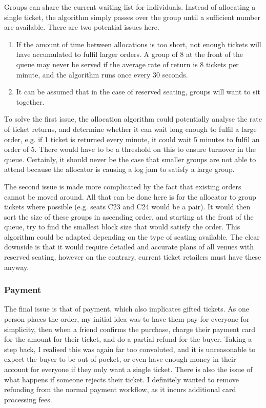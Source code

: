 \documentclass[12pt,a4paper]{bhamdissertation}
\begin{document}
Groups can share the current waiting list for individuals. Instead of allocating a single ticket, the algorithm simply passes over the group until a sufficient number are available. There are two potential issues here.

\begin{enumerate}
    \item If the amount of time between allocations is too short, not enough tickets will have accumulated to fulfil larger orders. A group of 8 at the front of the queue may never be served if the average rate of return is 8 tickets per minute, and the algorithm runs once every 30 seconds.
    \item It can be assumed that in the case of reserved seating, groups will want to sit together.
\end{enumerate}

To solve the first issue, the allocation algorithm could potentially analyse the rate of ticket returns, and determine whether it can wait long enough to fulfil a large order, e.g. if 1 ticket is returned every minute, it could wait 5 minutes to fulfil an order of 5. There would have to be a threshold on this to ensure turnover in the queue. Certainly, it should never be the case that smaller groups are not able to attend because the allocator is causing a log jam to satisfy a large group.

The second issue is made more complicated by the fact that existing orders cannot be moved around. All that can be done here is for the allocator to group tickets where possible (e.g. seats C23 and C24 would be a pair). It would then sort the size of these groups in ascending order, and starting at the front of the queue, try to find the smallest block size that would satisfy the order. This algorithm could be adapted depending on the type of seating available. The clear downside is that it would require detailed and accurate plans of all venues with reserved seating, however on the contrary, current ticket retailers must have these anyway.

\subsubsection{Payment}

The final issue is that of payment, which also implicates gifted tickets. As one person places the order, my initial idea was to have them pay for everyone for simplicity, then when a friend confirms the purchase, charge their payment card for the amount for their ticket, and do a partial refund for the buyer. Taking a step back, I realised this was again far too convoluted, and it is unreasonable to expect the buyer to be out of pocket, or even have enough money in their account for everyone if they only want a single ticket. There is also the issue of what happens if someone rejects their ticket. I definitely wanted to remove refunding from the normal payment workflow, as it incurs additional card processing fees.
\end{document}
